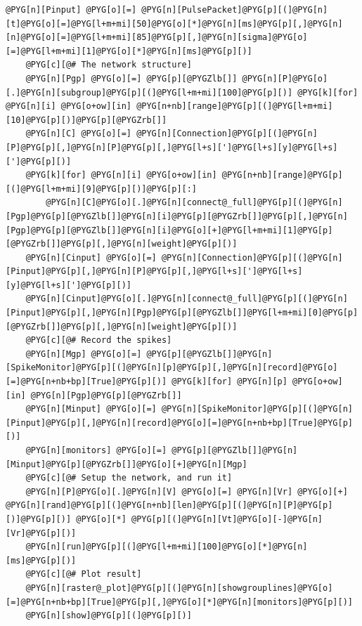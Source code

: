 \documentclass[letterpaper,10pt,english]{manual}
\begin{document}
\begin{Verbatim}[commandchars=@\[\]]
    @PYG[n][Pinput] @PYG[o][=] @PYG[n][PulsePacket]@PYG[p][(]@PYG[n][t]@PYG[o][=]@PYG[l+m+mi][50]@PYG[o][*]@PYG[n][ms]@PYG[p][,]@PYG[n][n]@PYG[o][=]@PYG[l+m+mi][85]@PYG[p][,]@PYG[n][sigma]@PYG[o][=]@PYG[l+m+mi][1]@PYG[o][*]@PYG[n][ms]@PYG[p][)]
    @PYG[c][@# The network structure]
    @PYG[n][Pgp] @PYG[o][=] @PYG[p][@PYGZlb[]] @PYG[n][P]@PYG[o][.]@PYG[n][subgroup]@PYG[p][(]@PYG[l+m+mi][100]@PYG[p][)] @PYG[k][for] @PYG[n][i] @PYG[o+ow][in] @PYG[n+nb][range]@PYG[p][(]@PYG[l+m+mi][10]@PYG[p][)]@PYG[p][@PYGZrb[]]
    @PYG[n][C] @PYG[o][=] @PYG[n][Connection]@PYG[p][(]@PYG[n][P]@PYG[p][,]@PYG[n][P]@PYG[p][,]@PYG[l+s][']@PYG[l+s][y]@PYG[l+s][']@PYG[p][)]
    @PYG[k][for] @PYG[n][i] @PYG[o+ow][in] @PYG[n+nb][range]@PYG[p][(]@PYG[l+m+mi][9]@PYG[p][)]@PYG[p][:]
        @PYG[n][C]@PYG[o][.]@PYG[n][connect@_full]@PYG[p][(]@PYG[n][Pgp]@PYG[p][@PYGZlb[]]@PYG[n][i]@PYG[p][@PYGZrb[]]@PYG[p][,]@PYG[n][Pgp]@PYG[p][@PYGZlb[]]@PYG[n][i]@PYG[o][+]@PYG[l+m+mi][1]@PYG[p][@PYGZrb[]]@PYG[p][,]@PYG[n][weight]@PYG[p][)]
    @PYG[n][Cinput] @PYG[o][=] @PYG[n][Connection]@PYG[p][(]@PYG[n][Pinput]@PYG[p][,]@PYG[n][P]@PYG[p][,]@PYG[l+s][']@PYG[l+s][y]@PYG[l+s][']@PYG[p][)]
    @PYG[n][Cinput]@PYG[o][.]@PYG[n][connect@_full]@PYG[p][(]@PYG[n][Pinput]@PYG[p][,]@PYG[n][Pgp]@PYG[p][@PYGZlb[]]@PYG[l+m+mi][0]@PYG[p][@PYGZrb[]]@PYG[p][,]@PYG[n][weight]@PYG[p][)]
    @PYG[c][@# Record the spikes]
    @PYG[n][Mgp] @PYG[o][=] @PYG[p][@PYGZlb[]]@PYG[n][SpikeMonitor]@PYG[p][(]@PYG[n][p]@PYG[p][,]@PYG[n][record]@PYG[o][=]@PYG[n+nb+bp][True]@PYG[p][)] @PYG[k][for] @PYG[n][p] @PYG[o+ow][in] @PYG[n][Pgp]@PYG[p][@PYGZrb[]]
    @PYG[n][Minput] @PYG[o][=] @PYG[n][SpikeMonitor]@PYG[p][(]@PYG[n][Pinput]@PYG[p][,]@PYG[n][record]@PYG[o][=]@PYG[n+nb+bp][True]@PYG[p][)]
    @PYG[n][monitors] @PYG[o][=] @PYG[p][@PYGZlb[]]@PYG[n][Minput]@PYG[p][@PYGZrb[]]@PYG[o][+]@PYG[n][Mgp]
    @PYG[c][@# Setup the network, and run it]
    @PYG[n][P]@PYG[o][.]@PYG[n][V] @PYG[o][=] @PYG[n][Vr] @PYG[o][+] @PYG[n][rand]@PYG[p][(]@PYG[n+nb][len]@PYG[p][(]@PYG[n][P]@PYG[p][)]@PYG[p][)] @PYG[o][*] @PYG[p][(]@PYG[n][Vt]@PYG[o][-]@PYG[n][Vr]@PYG[p][)]
    @PYG[n][run]@PYG[p][(]@PYG[l+m+mi][100]@PYG[o][*]@PYG[n][ms]@PYG[p][)]
    @PYG[c][@# Plot result]
    @PYG[n][raster@_plot]@PYG[p][(]@PYG[n][showgrouplines]@PYG[o][=]@PYG[n+nb+bp][True]@PYG[p][,]@PYG[o][*]@PYG[n][monitors]@PYG[p][)]
    @PYG[n][show]@PYG[p][(]@PYG[p][)]



\end{Verbatim}
\end{document}
